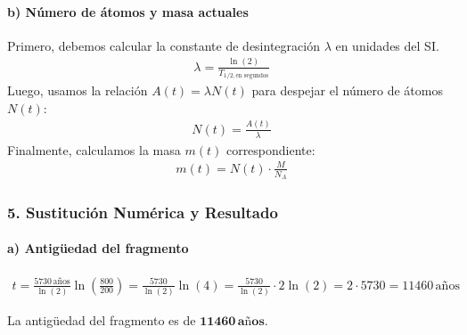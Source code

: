 \paragraph{b) Número de átomos y masa actuales}
Primero, debemos calcular la constante de desintegración $\lambda$ en unidades del SI.
\begin{gather}
    \lambda = \frac{\ln(2)}{T_{1/2, \text{en segundos}}}
\end{gather}
Luego, usamos la relación $A(t) = \lambda N(t)$ para despejar el número de átomos $N(t)$:
\begin{gather}
    N(t) = \frac{A(t)}{\lambda}
\end{gather}
Finalmente, calculamos la masa $m(t)$ correspondiente:
\begin{gather}
    m(t) = N(t) \cdot \frac{M}{N_A}
\end{gather}

\subsubsection*{5. Sustitución Numérica y Resultado}
\paragraph{a) Antigüedad del fragmento}
\begin{gather}
    t = \frac{5730 \, \text{años}}{\ln(2)} \ln\left(\frac{800}{200}\right) = \frac{5730}{\ln(2)} \ln(4) = \frac{5730}{\ln(2)} \cdot 2\ln(2) = 2 \cdot 5730 = 11460 \, \text{años}
\end{gather}
\begin{cajaresultado}
    La antigüedad del fragmento es de $\boldsymbol{11460 \, \textbf{años}}$.
\end{cajaresultado}

